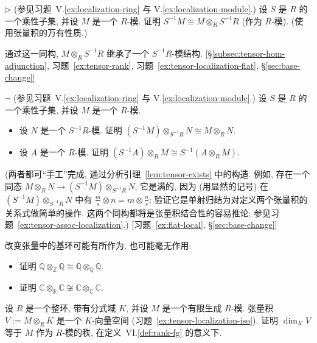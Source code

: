 \begin{prob}\label{ex:tensor-localization-iso}
$\triangleright$ (参见习题~V.\ref{ex:localization-ring} 与 V.\ref{ex:localization-module}.) 设 $S$ 是 $R$ 的一个乘性子集, 并设 $M$ 是一个 $R$-模. 证明 $S^{-1}M\cong M\otimes_R S^{-1}R$ (作为 $R$-模). (使用张量积的万有性质.)
\end{prob}

通过这一同构, $M\otimes_R S^{-1}R$ 继承了一个 $S^{-1}R$-模结构. [§\ref{subsec:tensor-hom-adjunction}, 习题~\ref{ex:tensor-rank}, 习题~\ref{ex:tensor-localization-flat}, §\ref{sec:base-change}]

\begin{prob}\label{ex:tensor-localization-assoc}
$\neg$ (参见习题~V.\ref{ex:localization-ring} 与 V.\ref{ex:localization-module}.) 设 $S$ 是 $R$ 的一个乘性子集, 并设 $M$ 是一个 $R$-模.
\begin{itemize}
\item 设 $N$ 是一个 $S^{-1}R$-模. 证明 $(S^{-1}M)\otimes_{S^{-1}R} N\cong M\otimes_R N$.
\item 设 $A$ 是一个 $R$-模. 证明 $(S^{-1}A)\otimes_R M\cong S^{-1}(A\otimes_R M)$.
\end{itemize}
(两者都可``手工''完成, 通过分析引理~\ref{lem:tensor-exists} 中的构造. 例如, 存在一个同态 $M\otimes_R N\to (S^{-1}M)\otimes_{S^{-1}R} N$, 它是满的, 因为 (用显然的记号) 在 $(S^{-1}M)\otimes_{S^{-1}R} N$ 中有 $\frac{m}{s}\otimes n=m\otimes\frac{n}{s}$; 验证它是单射归结为对定义两个张量积的关系式做简单的操作. 这两个同构都将是张量积结合性的容易推论; 参见习题~\ref{ex:tensor-assoc-localization}.) [习题~\ref{ex:flat-local}, §\ref{sec:base-change}]
\end{prob}

\begin{prob}\label{ex:tensor-base-change-field}
改变张量中的基环可能有所作为, 也可能毫无作用:
\begin{itemize}
\item 证明 $\mathbb{Q}\otimes_{\mathbb{Z}}\mathbb{Q}\cong\mathbb{Q}\otimes_{\mathbb{Q}}\mathbb{Q}$.
\item 证明 $\mathbb{C}\otimes_{\mathbb{R}}\mathbb{C}\not\cong\mathbb{C}\otimes_{\mathbb{C}}\mathbb{C}$.
\end{itemize}
\end{prob}

\begin{prob}\label{ex:tensor-rank}
设 $R$ 是一个整环, 带有分式域 $K$, 并设 $M$ 是一个有限生成 $R$-模. 张量积 $V:=M\otimes_R K$ 是一个 $K$-向量空间 (习题~\ref{ex:tensor-localization-iso}). 证明 $\dim_K V$ 等于 $M$ 作为 $R$-模的秩, 在定义~VI.\ref{def:rank-fg} 的意义下.
\end{prob}

